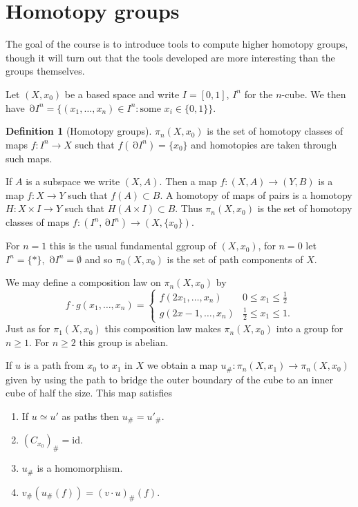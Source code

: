 \documentclass[10pt,]{book}
\theoremstyle{plain}
\theoremstyle{definition}
\newtheorem{definition}[theorem]{Definition}
\DeclareMathOperator{\dd}{\partial}
\begin{document}
\section[Homotopy groups]{Homotopy groups}\label{sec-homotopy}
The goal of the course is to introduce tools to compute higher homotopy groups, though it will turn out that the tools developed are more interesting than the groups themselves.%
\par
Let \((X,x_0)\) be a based space and write \(I = [0,1]\), \(I^n\) for the \(n\)-cube.
          We then have \(\dd I^n = \{(x_1,\ldots,x_n)\in I^n : \text{some } x_i \in\{0,1\}\}\).
\begin{definition}[Homotopy groups]\label{definition-1}
\(\pi_n(X,x_0)\) is the set of homotopy classes of maps \(f\colon I^n\to X\) such that \(f(\dd I^n) = \{x_0\}\) and homotopies are taken through such maps.\end{definition}
\par
 If \(A\) is a subspace we write \((X,A)\).
          Then a map \(f\colon (X,A)\to (Y,B)\) is a map \(f\colon X\to Y\) such that \(f(A)\subset B\).
          A homotopy of maps of pairs is a homotopy \(H\colon X\times I \to Y\) such that \(H(A\times I) \subset B\).
          \newline{}
          Thus \(\pi_n(X,x_0)\) is the set of homotopy classes of maps \(f\colon (I^n,\dd I^n) \to (X,\{x_0\})\).
\par
For \(n= 1\) this is the usual fundamental ggroup of \((X,x_0)\), for \(n= 0\) let \(I^n = \{*\}\), \(\dd I^n = \emptyset\) and so \(\pi_0(X,x_0)\) is the set of path components of \(X\).%
\par
We may define a composition law on \(\pi_n(X,x_0)\) by \[f\cdot g(x_1,\ldots,x_n)= \begin{cases}f(2x_1,\ldots,x_n) & 0\le x_1\le \frac12\\g(2x-1, \ldots,x_n)&\frac12\le x_1\le 1.\end{cases}\]
          Just as for \(\pi_1(X,x_0)\) this composition law makes \(\pi_n(X,x_0)\) into a group for \(n\ge 1\).
          For \(n\ge 2\) this group is abelian.
\par
If \(u\) is a path from \(x_0\) to \(x_1\) in \(X\) we obtain a map \(u_\#\colon \pi_n(X,x_1) \to \pi_n(X,x_0)\) given by using the path to bridge the outer boundary of the cube to an inner cube of half the size.
          This map satisfies
          \begin{enumerate}
\item{}If \(u\simeq u'\) as paths then \(u_\# = u'_\#\).\item{}\((C_{x_0})_\# = \mathrm{id}\).\item{}\(u_\#\) is a homomorphism.\item{}\(v_\#(u_\#(f)) = (v\cdot u)_\# (f)\).\end{enumerate}
\end{document}
